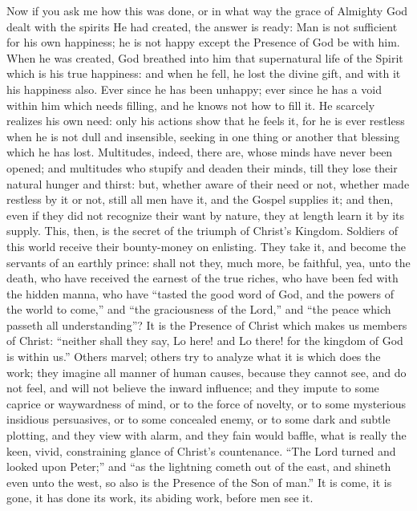 Now if you ask me how this was done, or in what way the grace of
Almighty God dealt with the spirits He had created, the answer is
ready: Man is not sufficient for his own happiness; he is not happy
except the Presence of God be with him. When he was created, God
breathed into him that supernatural life of the Spirit which is his
true happiness: and when he fell, he lost the divine gift, and with it
his happiness also. Ever since he has been unhappy; ever since he has
a void within him which needs filling, and he knows not how to fill
it. He scarcely realizes his own need: only his actions show that he
feels it, for he is ever restless when he is not dull and insensible,
seeking in one thing or another that blessing which he has lost.
Multitudes, indeed, there are, whose minds have never been opened; and
multitudes who stupify and deaden their minds, till they lose their
natural hunger and thirst: but, whether aware of their need or not,
whether made restless by it or not, still all men have it, and the
Gospel supplies it; and then, even if they did not recognize their
want by nature, they at length learn it by its supply. This, then, is
the secret of the triumph of Christ's Kingdom. Soldiers of this world
receive their bounty-money on enlisting. They take it, and become the
servants of an earthly prince: shall not they, much more, be faithful,
yea, unto the death, who have received the earnest of the true riches,
who have been fed with the hidden manna, who have ``tasted the
good word of God, and the powers of the world to come,'' and
``the graciousness of the Lord,'' and ``the peace which
passeth all understanding''? It is the Presence of Christ which
makes us members of Christ: ``neither shall they say, Lo here! and
Lo there! for the kingdom of God is within us.'' Others marvel;
others try to analyze what it is which does the work; they imagine all
manner of human causes, because they cannot see, and do not feel, and
will not believe the inward influence; and they impute to some caprice
or waywardness of mind, or to the force of novelty, or to some
mysterious insidious persuasives, or to some concealed enemy, or to
some dark and subtle plotting, and they view with alarm, and they fain
would baffle, what is really the keen, vivid, constraining glance of
Christ's countenance. ``The Lord turned and looked upon
Peter;'' and ``as the lightning cometh out of the east, and
shineth even unto the west, so also is the Presence of the Son of
man.'' It is come, it is gone, it has done its work, its abiding
work, before men see it.

